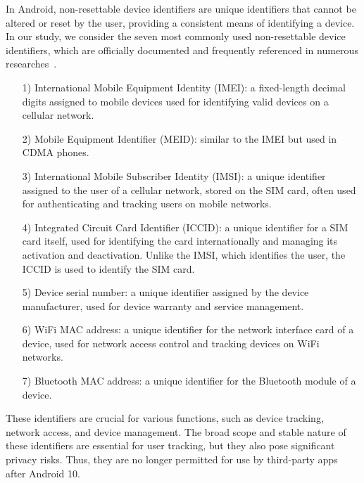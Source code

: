 In Android, non-resettable device identifiers are unique identifiers that cannot be altered or reset by the user, providing a consistent means of identifying a device. 
In our study, we consider the seven most commonly used non-resettable device identifiers, which are officially documented and frequently referenced in numerous researches~\cite{meng2023post, razaghpanah2018apps, reardon201950, ren2018longitudinal, stevens2012investigating}.
\begin{itemize}
    \item[1)] International Mobile Equipment Identity (IMEI): a fixed-length decimal digits assigned to mobile devices used for identifying valid devices on a cellular network. 
    \item[2)] Mobile Equipment Identifier (MEID): similar to the IMEI but used in CDMA phones.
    \item[3)] International Mobile Subscriber Identity (IMSI): a unique identifier assigned to the user of a cellular network, stored on the SIM card, often used for authenticating and tracking users on mobile networks.
    \item[4)] Integrated Circuit Card Identifier (ICCID): a unique identifier for a SIM card itself, used for identifying the card internationally and managing its activation and deactivation. Unlike the IMSI, which identifies the user, the ICCID is used to identify the SIM card.
    \item[5)] Device serial number: a unique identifier assigned by the device manufacturer, used for device warranty and service management. 
    \item[6)] WiFi MAC address: a unique identifier for the network interface card of a device, used for network access control and tracking devices on WiFi networks. 
    \item[7)] Bluetooth MAC address: a unique identifier for the Bluetooth module of a device. 
\end{itemize}

These identifiers are crucial for various functions, such as device tracking, network access, and device management.
The broad scope and stable nature of these identifiers are essential for user tracking, but they also pose significant privacy risks. Thus, they are no longer permitted for use by third-party apps after Android 10.

